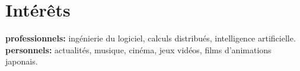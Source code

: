\documentclass[]{cv_french} %
\begin{document}

\section{Intérêts}

\textbf{professionnels:} ingénierie du logiciel, calculs distribués, intelligence artificielle. \\
\textbf{personnels:} actualités, musique, cinéma, jeux vidéos, films d'animations japonais.


\end{document}
